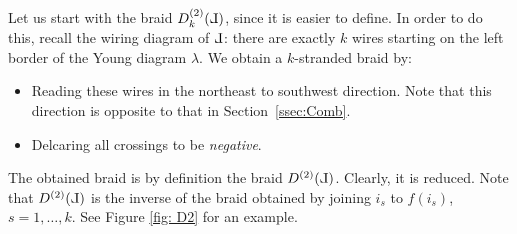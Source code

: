 \documentclass[10pt]{amsart}
\theoremstyle{plain}
\theoremstyle{definition}
\theoremstyle{remark}
\numberwithin{equation}{section}
\newcommand{\MG}[1]{{\color{teal}{{\bf Misha}: #1}}}
\def\Le{\reflectbox{$\mathrm{L}$}}
\begin{document}
Let us start with the braid $D_{k}^{(2)}(\Le)$, since it is easier to define. In order to do this, recall the wiring diagram of $\Le$: there are exactly $k$ wires starting on the left border of the Young diagram $\lambda$. We obtain a $k$-stranded braid by:
\begin{itemize}
    \item Reading these wires in the northeast to southwest direction. Note that this direction is opposite to that in Section~\ref{ssec:Comb}.
    \item Delcaring all crossings to be \emph{negative}. 
\end{itemize}

The obtained braid is by definition the braid $D^{(2)}(\Le)$. Clearly, it is reduced. Note that $D^{(2)}(\Le)$ is the inverse of the braid obtained by joining $i_s$ to $f(i_s)$, $s = 1, \dots, k$. See Figure \ref{fig: D2} for an example. %
\end{document}
